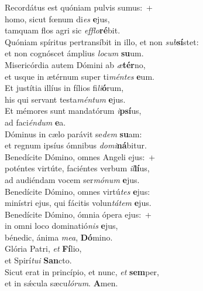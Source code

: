 \evenverse Recordátus est quóniam pulvis sumus:~+\\\evenverse  homo, sicut fœnum di\textit{es} \textbf{e}jus,~\*\\
\evenverse tamquam flos agri sic \textit{ef}\textit{flo}\textbf{ré}bit.\\
\oddverse Quóniam spíritus pertransíbit in illo, et non \textit{sub}\textbf{sí}stet:~\*\\
\oddverse et non cognóscet ámplius \textit{lo}\textit{cum} \textbf{su}um.\\
\evenverse Misericórdia autem Dómini ab \textit{æ}\textbf{tér}no,~\*\\
\evenverse et usque in ætérnum super ti\textit{mén}\textit{tes} \textbf{e}um.\\
\oddverse Et justítia illíus in fílios fi\textit{li}\textbf{ó}rum,~\*\\
\oddverse his qui servant testa\textit{mén}\textit{tum} \textbf{e}jus.\\
\evenverse Et mémores sunt mandatórum \textit{i}\textbf{psí}us,~\*\\
\evenverse ad faci\textit{én}\textit{dum} \textbf{e}a.\\
\oddverse Dóminus in cælo parávit se\textit{dem} \textbf{su}am:~\*\\
\oddverse et regnum ipsíus ómnibus \textit{do}\textit{mi}\textbf{ná}bitur.\\
\evenverse Benedícite Dómino, omnes Angeli ejus:~+\\
\evenverse  poténtes virtúte, faciéntes verbum \textit{il}\textbf{lí}us,~\*\\
\evenverse ad audiéndam vocem ser\textit{mó}\textit{num} \textbf{e}jus.\\
\oddverse Benedícite Dómino, omnes virtú\textit{tes} \textbf{e}jus:~\*\\
\oddverse minístri ejus, qui fácitis volun\textit{tá}\textit{tem} \textbf{e}jus.\\
\evenverse Benedícite Dómino, ómnia ópera ejus:~+\\
\evenverse  in omni loco dominatió\textit{nis} \textbf{e}jus,~\*\\
\evenverse bénedic, ánima \textit{me}\textit{a}, \textbf{Dó}mino.\\
\oddverse Glória Patri, \textit{et} \textbf{Fí}lio,~\*\\
\oddverse et Spirí\textit{tu}\textit{i} \textbf{San}cto.\\
\evenverse Sicut erat in princípio, et nunc, \textit{et} \textbf{sem}per,~\*\\
\evenverse et in sǽcula sæcu\textit{ló}\textit{rum}. \textbf{A}men.\\
